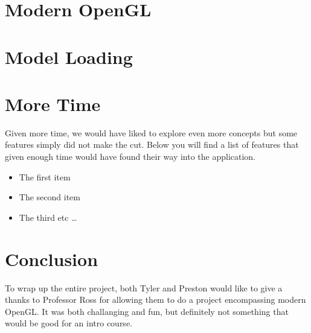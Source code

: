\documentclass[paper=a4, fontsize=11pt]{scrartcl}
\numberwithin{equation}{section}		%
\numberwithin{figure}{section}			%
\numberwithin{table}{section}				%
\begin{document}
\section{Modern OpenGL}

\section{Model Loading}

\section{More Time}
Given more time, we would have liked to explore even more concepts but some features simply did not make the cut. Below you will find a list of features that given enough time would have found their way into the application.
\begin{itemize}  
	\item The first item 
	\item The second item 
	\item The third etc 
	\ldots
\end{itemize}

\section{Conclusion}
To wrap up the entire project, both Tyler and Preston would like to give a thanks to Professor Ross for allowing them to do a project encompassing modern OpenGL. It was both challanging and fun, but definitely not something that would be good for an intro course.

\end{document}
